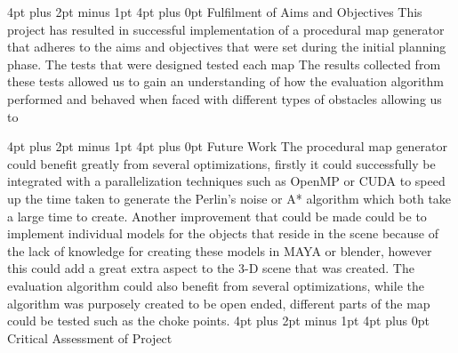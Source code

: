 \documentclass[12pt,a4paper,oneside]{book}
\makeatletter
\renewcommand\section{\@startsection {section}{1}{0mm} %
                               {4pt plus 2pt minus 1pt} %
                               {4pt plus 0pt} %
                               {\bfseries}}
\makeatother
\begin{document}
\section{Fulfilment of Aims and Objectives}
This project has resulted in successful implementation of a procedural map generator that adheres to the aims and objectives that were set during the initial planning phase. The tests that were designed tested each map 
\newline
The results collected from these tests allowed us to gain an understanding of how the evaluation algorithm performed and behaved when faced with different types of obstacles allowing us to 

\section{Future Work}
The procedural map generator could benefit greatly from several optimizations, firstly it could successfully be integrated with a parallelization techniques such as OpenMP or CUDA to speed up the time taken to generate the Perlin's noise or A* algorithm which both take a large time to create. 
\vspace{5mm} 
\newline
Another improvement that could be made could be to implement individual models for the objects that reside in the scene because of the lack of knowledge for creating these models in MAYA or blender, however this could add a great extra aspect to the 3-D scene that was created.
\vspace{5mm} 
\newline
The evaluation algorithm could also benefit from several optimizations, while the algorithm was purposely created to be open ended, different parts of the map could be tested such as the choke points.   
\section{Critical Assessment of Project} 
\newpage



\end{document}
